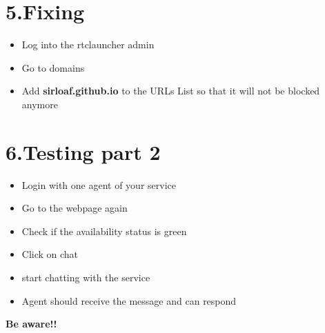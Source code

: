 \documentclass{article}
\begin{document}
\section{5.\hspace*{0.5em}Fixing}\label{sec-fixing}%

\begin{itemize}[noitemsep,topsep=\mdcompacttopsep]%

\item{}Log into the rtclauncher admin%

\item{}Go to domains%

\item{}Add \textbf{sirloaf.github.io} to the URLs List so that it will not be blocked anymore%
\end{itemize}%

\section{6.\hspace*{0.5em}Testing part 2}\label{sec-testing-part-2}%

\begin{itemize}[noitemsep,topsep=\mdcompacttopsep]%

\item{}Login with one agent of your service%

\item{}Go to the webpage again%

\item{}Check if the availability status is green%

\item{}Click on chat%

\item{}start chatting with the service%

\item{}Agent should receive the message and can respond%
\end{itemize}%

\noindent{}\textbf{Be aware!!}%
\end{document}
